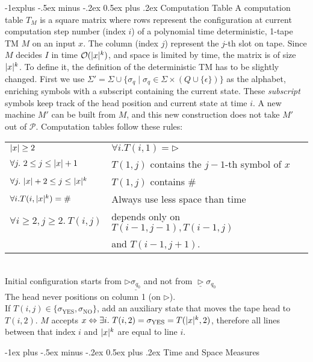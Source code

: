 \documentclass[10pt,landscape]{article}
\makeatletter
\newcommand{\bumper}{\triangleright}
\renewcommand{\O}{\mathcal{O}}
\renewcommand{\P}{\mathcal{P}}
\newcommand{\YES}{\mathrm{YES}}
\newcommand{\NO}{\mathrm{NO}}
\DeclarePairedDelimiter\abs{\lvert}{\rvert}
\renewcommand{\iff}{\Leftrightarrow}
\theoremstyle{plain}%
\theoremstyle{definition}
\theoremstyle{remark}
\renewcommand{\section}{\@startsection{section}{1}{0mm}%
                                {-1ex plus -.5ex minus -.2ex}%
                                {0.5ex plus .2ex}%
                                {\normalfont\large\bfseries}}
\renewcommand{\subsection}{\@startsection{subsection}{2}{0mm}%
                                {-1explus -.5ex minus -.2ex}%
                                {0.5ex plus .2ex}%
                                {\normalfont\normalsize\bfseries}}
\makeatother
\begin{document}
\begin{multicols}{4}
\subsection{Computation Table}
A computation table $T_M$ is a square matrix where rows represent the configuration  
at current computation step number (index $i$) of a polynomial time deterministic, 1-tape TM $M$ on an input $x$.
The column (index $j$) represent the $j$-th slot on tape.
Since $M$ decides $I$ in time $\O(\abs{x}^k)$, and space is limited by time, the matrix is
of size $\abs{x}^k$. To define it, the definition of the deterministic TM has to be slightly changed.
First we use $\Sigma' = \Sigma \cup \{\sigma_q \mid \sigma_q \in \Sigma \times (Q \cup \{\epsilon\})\}$ as the 
alphabet, enriching symbols with a subscript containing the current state. These \textit{subscript} symbols
keep track of the head position and current state at time $i$.
A new machine $M'$ can be built from $M$, and this new construction does not take $M'$ out of $\P$.
Computation tables follow these rules: 
\begin{tabular}{@{}ll@{}}
    $\abs{x} \geq 2$ & $\forall i . T(i,1) = \bumper $  \\
    $\forall j.\ 2 \leq j \leq \abs{x} + 1$ & $T(1,j)$ contains the $j-1$-th symbol of $x$ \\
    $\forall j.\ \abs{x} + 2 \leq j \leq \abs{x}^k$ & $T(1,j)$ contains $\#$ \\
    $\forall i . T(i,\abs{x}^k) = \# $ & Always use less space than time \\
    $\forall i \geq 2, j \geq 2.\ T(i,j)$ & depends only on $T(i-1,j-1),T(i-1,j)$\\
    & and $T(i-1,j+1)$.
\end{tabular} \\
Initial configuration starts from $\bumper \underline{\sigma_{q_0}}$ and not from $\underline{\bumper} \sigma_{q_0}$ \\
The head never positions on column 1 (on $\bumper$).\\
If $T(i,j) \in \{\sigma_{\YES},\sigma_{\NO}\}$, add an auxiliary state that moves 
the tape head to $T(i, 2)$.
$M$ accepts $x \iff \exists i .\ T(i,2) = \sigma_{\YES} = T(\abs{x}^k, 2)$, therefore
all lines between that index $i$ and $\abs{x}^k$ are equal to line $i$.


\section{Time and Space Measures}


\end{multicols}
\end{document}
